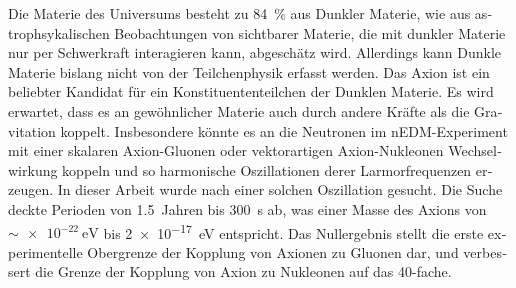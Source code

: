 \begin{otherlanguage}{german}
Die Materie des Universums besteht zu \SI{84}{\percent} aus Dunkler Materie, wie aus astrophsykalischen Beobachtungen von sichtbarer Materie, die mit dunkler Materie nur per Schwerkraft interagieren kann, abgeschätz wird.
Allerdings kann Dunkle Materie bislang nicht von der Teilchenphysik erfasst werden.
Das Axion ist ein beliebter Kandidat für ein Konstituententeilchen der Dunklen Materie.
Es wird erwartet, dass es an gewöhnlicher Materie auch durch andere Kräfte als die Gravitation koppelt.
Insbesondere könnte es an die Neutronen im nEDM-Experiment mit einer skalaren Axion-Gluonen oder vektorartigen Axion-Nukleonen Wechselwirkung koppeln und so harmonische Oszillationen derer Larmorfrequenzen erzeugen.
In dieser Arbeit wurde nach einer solchen Oszillation gesucht.
Die Suche deckte Perioden von \SI{1.5}{Jahren} bis \SI{300}{\second} ab, was einer Masse des Axions von $\sim \SI{e-22}{\electronvolt}$ bis \SI{2e-17}{\electronvolt} entspricht.
Das Nullergebnis stellt die erste experimentelle Obergrenze der Kopplung von Axionen zu Gluonen dar, und verbessert die Grenze der Kopplung von Axion zu Nukleonen auf das 40-fache.

\end{otherlanguage}

\endgroup

\vfill
